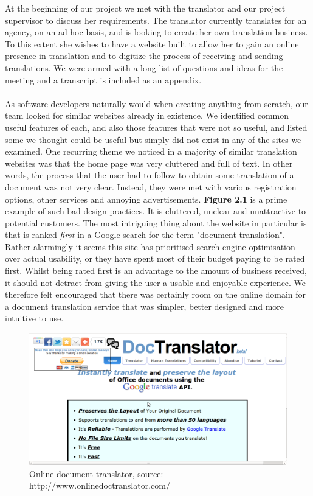 \documentclass{l3proj}
\begin{document}
At the beginning of our project we met with the translator and our project
supervisor to discuss her requirements. The translator currently translates for
an agency, on an ad-hoc basis, and is looking to create her own translation
business. To this extent she wishes to have a website built to allow her to gain
an online presence in translation and to digitize the process of receiving and
sending translations. We were armed with a long list of questions and ideas for
the meeting and a transcript is included as an appendix.\\
\\
As software developers naturally would when creating anything from scratch, our
team looked for similar websites already in existence. We identified common
useful features of each, and also those features that were not so useful, and
listed some we thought could be useful but simply did not exist in any of the
sites we examined. One recurring theme we noticed in a majority of similar
translation websites was that the home page was very cluttered and full of text.
In other words, the process that the user had to follow to obtain some
translation of a document was not very clear. Instead, they were met with
various registration options, other services and annoying advertisements.
\textbf{Figure 2.1} is a prime example of such bad design practices. It is
cluttered, unclear and unattractive to potential customers. The most intriguing
thing about the website in particular is that is ranked \textit{first} in a
Google search for the term "document translation". Rather alarmingly it seems
this site has prioritised search engine optimisation over actual usability, or
they have spent most of their budget paying to be rated first. Whilst being
rated first is an advantage to the amount of business received, it should not
detract from giving the user a usable and enjoyable experience. We therefore
felt encouraged that there was certainly room on the online domain for a
document translation service that was simpler, better designed and more
intuitive to use.

\begin{figure}
\begin{center}
\includegraphics[scale=0.4]{ex1doctrans}
\caption{Online document translator, source: http://www.onlinedoctranslator.com/}
\end{center}
\end{figure}
\end{document}
